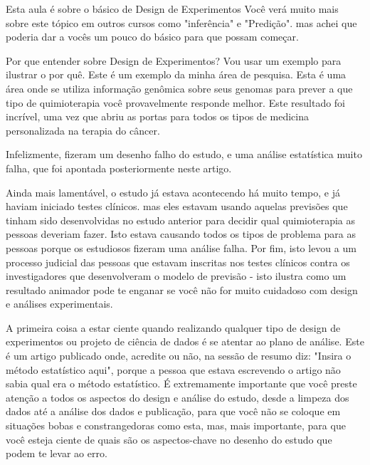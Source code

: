 \begin{multicols}{2}
\begin{footnotesize}
Esta aula é sobre o básico de Design de Experimentos Você verá muito mais sobre este tópico em outros cursos como "inferência" e "Predição". mas achei que poderia dar a vocês um pouco do básico para que possam começar. 

Por que entender sobre Design de Experimentos? Vou usar um exemplo para ilustrar o por quê. Este é um exemplo da minha área de pesquisa. Esta é uma área onde se utiliza informação genômica sobre seus genomas para prever a que tipo de quimioterapia você provavelmente responde melhor. Este resultado foi incrível, uma vez que abriu as portas para todos os tipos de medicina personalizada na terapia do câncer. 

Infelizmente, fizeram um desenho falho do estudo, e uma análise estatística muito falha, que foi apontada posteriormente neste artigo. 

Ainda mais lamentável, o estudo já estava acontecendo há muito tempo, e já haviam iniciado testes clínicos. mas eles estavam usando aquelas previsões que tinham sido desenvolvidas no estudo anterior para decidir qual quimioterapia as pessoas deveriam fazer. Isto estava causando todos os tipos de problema para as pessoas porque os estudiosos fizeram uma análise falha. Por fim, isto levou a um processo judicial das pessoas que estavam inscritas nos testes clínicos contra os investigadores que desenvolveram o modelo de previsão - isto ilustra como um resultado animador pode te enganar se você não for muito cuidadoso com design e análises experimentais. 

A primeira coisa a estar ciente quando realizando qualquer tipo de design de experimentos ou projeto de ciência de dados é se atentar ao plano de análise. Este é um artigo publicado onde, acredite ou não, na sessão de resumo diz: "Insira o método estatístico aqui", porque a pessoa que estava escrevendo o artigo não sabia qual era o método estatístico. É extremamente importante que você preste atenção a todos os aspectos do design e análise do estudo, desde a limpeza dos dados até a análise dos dados e publicação, para que você não se coloque em situações bobas e constrangedoras como esta, mas, mais importante, para que você esteja ciente de quais são os aspectos-chave no desenho do estudo que podem te levar ao erro. 


\end{footnotesize}
\end{multicols}
